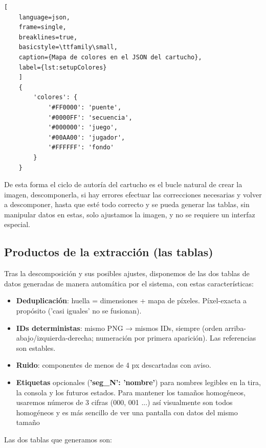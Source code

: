 \begin{lstlisting}[
	language=json, 
	frame=single, 
	breaklines=true, 
	basicstyle=\ttfamily\small,
	caption={Mapa de colores en el JSON del cartucho},
	label={lst:setupColores}
	]
	{
		'colores': {
			'#FF0000': 'puente',
			'#0000FF': 'secuencia',
			'#000000': 'juego',
			'#00AA00': 'jugador',
			'#FFFFFF': 'fondo'
		}
	}
\end{lstlisting}

De esta forma el ciclo de autoría del cartucho es el bucle natural de crear la imagen, descomponerla, si hay errores efectuar las correcciones necesarias y volver a descomponer, hasta que esté todo correcto y se pueda generar las tablas, sin manipular datos en estas, solo ajustamos la imagen, y no se requiere un interfaz especial.
	
\subsection{Productos de la extracción (las tablas)}

Tras la descomposición y sus posibles ajustes, disponemos de las dos tablas de datos generadas de manera automática por el sistema, con estas características:

\begin{itemize}
	\item \textbf{Deduplicación}: huella = dimensiones + mapa de píxeles. Píxel-exacta a propósito ('casi iguales' no se fusionan).
	\item \textbf{IDs deterministas}: mismo PNG → mismos IDs, siempre (orden arriba-abajo/izquierda-derecha; numeración por primera aparición). Las referencias son estables.
	\item \textbf{Ruido}: componentes de menos de 4 px descartadas con aviso.
	\item \textbf{Etiquetas} opcionales (\textbf{'seg\_N': 'nombre'}) para nombres legibles en la tira, la consola y los futuros estados. Para mantener los tamaños homogéneos, usaremos números de 3 cifras (000, 001 ...) así visualmente son todos homogéneos y es más sencillo de ver una pantalla con datos del mismo tamaño
\end{itemize}

Las dos tablas que generamos son:

